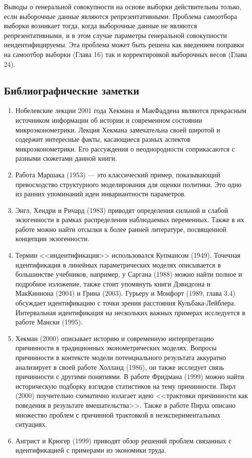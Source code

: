 Выводы о генеральной совокупности на основе выборки действительны только, если выборочные данные являются репрезентативными. Проблема самоотбора выборки возникает тогда, когда выборочные данные не являются репрезентативными, и в этом случае параметры генеральной совокупности неидентифицируемы. Эта проблема может быть решена как введением поправки на самоотбор выборки (Глава 16) так и корректировкой выборочных весов (Глава 24).



\subsection{Библиографические заметки}

\begin{enumerate}
\item Нобелевские лекции 2001 года Хекмана и МакФаддена являются прекрасным источником информации об истории и современном состоянии микроэконометрики. Лекция Хекмана замечательна своей широтой и содержит интересные факты, касающиеся разных аспектов микроэконометрики. Его рассуждения о неоднородности соприкасаются с разными сюжетами данной книги.
\item Работа Маршака (1953) --- это классический пример, показывающий превосходство структурного моделирования для оценки политики. Это одно из ранних упоминаний идеи инвариантности параметров. 
\item Энгл, Хендри и Ричард (1983) приводят определения сильной и слабой экзогенности в рамках распределения наблюдаемых переменных. Также в их работе можно найти отсылки к более ранней литературе, посвященной концепции экзогенности. 
\item Термин <<индентификация>> использовался Купмансом (1949). Точечная идентификация в линейных параметрических моделях описывается в большинстве учебников, например, у Саргана (1988) можно найти полное и подробное изложение, также стоит упомянуть книги Дэвидсона и МакКиннона (2004) и Грина (2003). Гурьеру и Монфорт (1989, глава 3.4) обсуждает идентификацию с точки зрения расстояния Кульбака-Лейблера. Интервальная идентификация на нескольких важных примерах исследуется в работе Мански (1995).
\item Хекман (2000) описывает историю и современную интерпретацию причинности в традиционных эконометрических моделях. Вопросы причинности в контексте модели потенциального результата аккуратно анализирует в своей работе Холланд (1986), он также исследует связь причинности с другими понятиями. В работе Фридмана (1999) можно найти историческую подборку взглядов статистиков на тему причинности. Пирл (2000) поучительно схематично излагает идею <<трактовки причинности как поведения в результате вмешательства>>. Также в работе Пирла описано множество проблем с причинной трактовкой в неэкспериментальных ситуациях. 
\item Ангрист и Крюгер (1999) приводят обзор решений проблем связанных с идентификацией с примерами из экономики труда. 


\end{enumerate}









